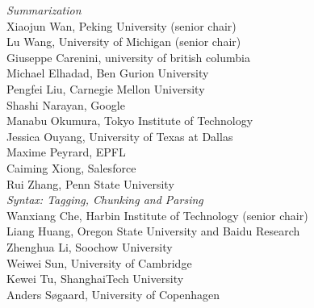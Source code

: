 \emph{Summarization} \\
\hspace*{0.2in} Xiaojun Wan, Peking University (senior chair)\\
\hspace*{0.2in} Lu Wang, University of Michigan (senior chair)\\
\hspace*{0.2in} Giuseppe Carenini, university of british columbia\\
\hspace*{0.2in} Michael Elhadad, Ben Gurion University\\
\hspace*{0.2in} Pengfei Liu, Carnegie Mellon University\\
\hspace*{0.2in} Shashi Narayan, Google\\
\hspace*{0.2in} Manabu Okumura, Tokyo Institute of Technology\\
\hspace*{0.2in} Jessica Ouyang, University of Texas at Dallas\\
\hspace*{0.2in} Maxime Peyrard, EPFL\\
\hspace*{0.2in} Caiming Xiong, Salesforce\\
\hspace*{0.2in} Rui Zhang, Penn State University\\

\emph{Syntax: Tagging, Chunking and Parsing} \\
\hspace*{0.2in} Wanxiang Che, Harbin Institute of Technology (senior chair)\\
\hspace*{0.2in} Liang Huang, Oregon State University and Baidu Research\\
\hspace*{0.2in} Zhenghua Li, Soochow University\\
\hspace*{0.2in} Weiwei Sun, University of Cambridge\\
\hspace*{0.2in} Kewei Tu, ShanghaiTech University\\
\hspace*{0.2in} Anders Søgaard, University of Copenhagen\\

